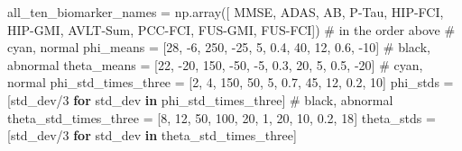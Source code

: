 \documentclass[
  letterpaper,
  DIV=11,
  numbers=noendperiod]{scrreprt}
\newenvironment{Shaded}{\begin{snugshade}}{\end{snugshade}}
\newcommand{\CommentTok}[1]{\textcolor[rgb]{0.37,0.37,0.37}{#1}}
\newcommand{\ControlFlowTok}[1]{\textcolor[rgb]{0.00,0.23,0.31}{\textbf{#1}}}
\newcommand{\DecValTok}[1]{\textcolor[rgb]{0.68,0.00,0.00}{#1}}
\newcommand{\FloatTok}[1]{\textcolor[rgb]{0.68,0.00,0.00}{#1}}
\newcommand{\KeywordTok}[1]{\textcolor[rgb]{0.00,0.23,0.31}{\textbf{#1}}}
\newcommand{\NormalTok}[1]{\textcolor[rgb]{0.00,0.23,0.31}{#1}}
\newcommand{\OperatorTok}[1]{\textcolor[rgb]{0.37,0.37,0.37}{#1}}
\newcommand{\StringTok}[1]{\textcolor[rgb]{0.13,0.47,0.30}{#1}}
\begin{document}
\begin{Shaded}
\begin{Highlighting}[]
\NormalTok{all\_ten\_biomarker\_names }\OperatorTok{=}\NormalTok{ np.array([}
    \StringTok{\textquotesingle{}MMSE\textquotesingle{}}\NormalTok{, }\StringTok{\textquotesingle{}ADAS\textquotesingle{}}\NormalTok{, }\StringTok{\textquotesingle{}AB\textquotesingle{}}\NormalTok{, }\StringTok{\textquotesingle{}P{-}Tau\textquotesingle{}}\NormalTok{, }\StringTok{\textquotesingle{}HIP{-}FCI\textquotesingle{}}\NormalTok{, }
    \StringTok{\textquotesingle{}HIP{-}GMI\textquotesingle{}}\NormalTok{, }\StringTok{\textquotesingle{}AVLT{-}Sum\textquotesingle{}}\NormalTok{, }\StringTok{\textquotesingle{}PCC{-}FCI\textquotesingle{}}\NormalTok{, }\StringTok{\textquotesingle{}FUS{-}GMI\textquotesingle{}}\NormalTok{, }\StringTok{\textquotesingle{}FUS{-}FCI\textquotesingle{}}\NormalTok{])}
\CommentTok{\# in the order above}
\CommentTok{\# cyan, normal}
\NormalTok{phi\_means }\OperatorTok{=}\NormalTok{ [}\DecValTok{28}\NormalTok{, }\OperatorTok{{-}}\DecValTok{6}\NormalTok{, }\DecValTok{250}\NormalTok{, }\OperatorTok{{-}}\DecValTok{25}\NormalTok{, }\DecValTok{5}\NormalTok{, }\FloatTok{0.4}\NormalTok{, }\DecValTok{40}\NormalTok{, }\DecValTok{12}\NormalTok{, }\FloatTok{0.6}\NormalTok{, }\OperatorTok{{-}}\DecValTok{10}\NormalTok{]}
\CommentTok{\# black, abnormal}
\NormalTok{theta\_means }\OperatorTok{=}\NormalTok{ [}\DecValTok{22}\NormalTok{, }\OperatorTok{{-}}\DecValTok{20}\NormalTok{, }\DecValTok{150}\NormalTok{, }\OperatorTok{{-}}\DecValTok{50}\NormalTok{, }\OperatorTok{{-}}\DecValTok{5}\NormalTok{, }\FloatTok{0.3}\NormalTok{, }\DecValTok{20}\NormalTok{, }\DecValTok{5}\NormalTok{, }\FloatTok{0.5}\NormalTok{, }\OperatorTok{{-}}\DecValTok{20}\NormalTok{]}
\CommentTok{\# cyan, normal}
\NormalTok{phi\_std\_times\_three }\OperatorTok{=}\NormalTok{ [}\DecValTok{2}\NormalTok{, }\DecValTok{4}\NormalTok{, }\DecValTok{150}\NormalTok{, }\DecValTok{50}\NormalTok{, }\DecValTok{5}\NormalTok{, }\FloatTok{0.7}\NormalTok{, }\DecValTok{45}\NormalTok{, }\DecValTok{12}\NormalTok{, }\FloatTok{0.2}\NormalTok{, }\DecValTok{10}\NormalTok{]}
\NormalTok{phi\_stds }\OperatorTok{=}\NormalTok{ [std\_dev}\OperatorTok{/}\DecValTok{3} \ControlFlowTok{for}\NormalTok{ std\_dev }\KeywordTok{in}\NormalTok{ phi\_std\_times\_three]}
\CommentTok{\# black, abnormal}
\NormalTok{theta\_std\_times\_three }\OperatorTok{=}\NormalTok{ [}\DecValTok{8}\NormalTok{, }\DecValTok{12}\NormalTok{, }\DecValTok{50}\NormalTok{, }\DecValTok{100}\NormalTok{, }\DecValTok{20}\NormalTok{, }\DecValTok{1}\NormalTok{, }\DecValTok{20}\NormalTok{, }\DecValTok{10}\NormalTok{, }\FloatTok{0.2}\NormalTok{, }\DecValTok{18}\NormalTok{]}
\NormalTok{theta\_stds }\OperatorTok{=}\NormalTok{ [std\_dev}\OperatorTok{/}\DecValTok{3} \ControlFlowTok{for}\NormalTok{ std\_dev }\KeywordTok{in}\NormalTok{ theta\_std\_times\_three]}


\end{Highlighting}
\end{Shaded}
\end{document}
